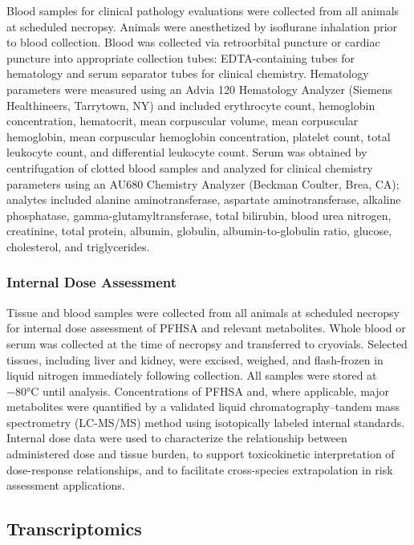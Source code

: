 Blood samples for clinical pathology evaluations were collected from all animals at scheduled necropsy. Animals were anesthetized by isoflurane inhalation prior to blood collection. Blood was collected via retroorbital puncture or cardiac puncture into appropriate collection tubes: EDTA-containing tubes for hematology and serum separator tubes for clinical chemistry. Hematology parameters were measured using an Advia 120 Hematology Analyzer (Siemens Healthineers, Tarrytown, NY) and included erythrocyte count, hemoglobin concentration, hematocrit, mean corpuscular volume, mean corpuscular hemoglobin, mean corpuscular hemoglobin concentration, platelet count, total leukocyte count, and differential leukocyte count. Serum was obtained by centrifugation of clotted blood samples and analyzed for clinical chemistry parameters using an AU680 Chemistry Analyzer (Beckman Coulter, Brea, CA); analytes included alanine aminotransferase, aspartate aminotransferase, alkaline phosphatase, gamma-glutamyltransferase, total bilirubin, blood urea nitrogen, creatinine, total protein, albumin, globulin, albumin-to-globulin ratio, glucose, cholesterol, and triglycerides.

\subsubsection{Internal Dose Assessment}

Tissue and blood samples were collected from all animals at scheduled necropsy for internal dose assessment of PFHSA and relevant metabolites. Whole blood or serum was collected at the time of necropsy and transferred to cryovials. Selected tissues, including liver and kidney, were excised, weighed, and flash-frozen in liquid nitrogen immediately following collection. All samples were stored at −80°C until analysis. Concentrations of PFHSA and, where applicable, major metabolites were quantified by a validated liquid chromatography–tandem mass spectrometry (LC-MS/MS) method using isotopically labeled internal standards. Internal dose data were used to characterize the relationship between administered dose and tissue burden, to support toxicokinetic interpretation of dose-response relationships, and to facilitate cross-species extrapolation in risk assessment applications.

\subsection{Transcriptomics}

